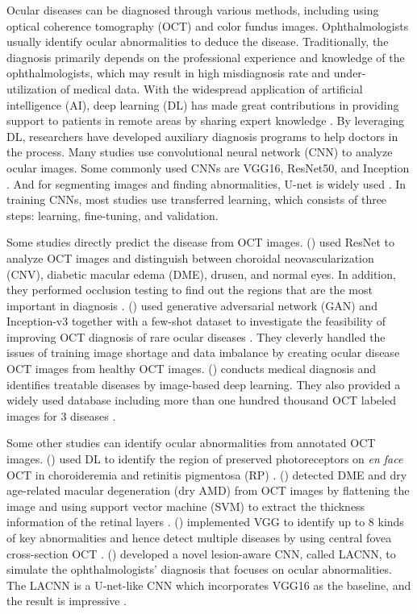 \documentclass{article}
\newcommand{\authyear}[1]{\citeauthor{#1} (\citeyear{#1})}
\begin{document}
		Ocular diseases can be diagnosed through various methods, including using optical coherence tomography (OCT) and color fundus images. Ophthalmologists usually identify ocular abnormalities to deduce the disease.  Traditionally, the diagnosis primarily depends on the professional experience and knowledge of the ophthalmologists, which may result in high misdiagnosis rate and under-utilization of medical data.  With the widespread application of artificial intelligence (AI), deep learning (DL) has made great contributions in providing support to patients in remote areas by sharing expert knowledge \autocite{Ichhpujani_Thakur_2021}.  By leveraging DL, researchers have developed auxiliary diagnosis programs to help doctors in the process. Many studies use convolutional neural network (CNN) to analyze ocular images. Some commonly used CNNs are VGG16, ResNet50, and Inception \autocite{daich2023artificial}.  And for segmenting images and finding abnormalities, U-net is widely used \autocite{Ronneberger_Fischer_Brox_2015}. In training CNNs, most studies use transferred learning, which consists of three steps: learning, fine-tuning, and validation.
		
		Some studies directly predict the disease from OCT images.
		\authyear{li2019deep} used ResNet to analyze OCT images and distinguish between choroidal neovascularization (CNV), diabetic macular edema (DME), drusen, and normal eyes. In addition, they performed occlusion testing to find out the regions that are the most important in diagnosis \autocite{li2019deep}. 
		\authyear{yoo2021feasibility} used generative adversarial network (GAN) and Inception-v3 together with a few-shot dataset to investigate the feasibility of improving OCT diagnosis of rare ocular diseases \autocite{yoo2021feasibility}.  They cleverly handled the issues of training image shortage and data imbalance by creating ocular disease OCT images from healthy OCT images. \authyear{Kermany2018} conducts medical diagnosis and identifies treatable diseases by image-based deep learning.  They also provided a widely used database including more than one hundred thousand OCT labeled images for 3 diseases \autocite{Kermany2018}.
		
		Some other studies can identify ocular abnormalities from annotated OCT images.
		\authyear{camino2018deep} used DL to identify the region of preserved photoreceptors on \textit{en face} OCT in choroideremia and retinitis pigmentosa (RP) \autocite{camino2018deep}. 
		\authyear{srinivasan2014fully} detected DME and dry age-related macular degeneration (dry AMD) from OCT images by flattening the image and using support vector machine (SVM) to extract the thickness information of the retinal layers \autocite{srinivasan2014fully}. 
		\authyear{leandro2023oct} implemented VGG to identify up to 8 kinds of key abnormalities and hence detect multiple diseases by using central fovea cross-section OCT \autocite{leandro2023oct}.  \authyear{Fang_Wang2019} developed a novel lesion-aware CNN, called LACNN, to simulate the ophthalmologists' diagnosis that focuses on ocular abnormalities.  The LACNN is a U-net-like CNN which incorporates VGG16 as the baseline, and the result is impressive \autocite{Fang_Wang2019}.
		
\end{document}
